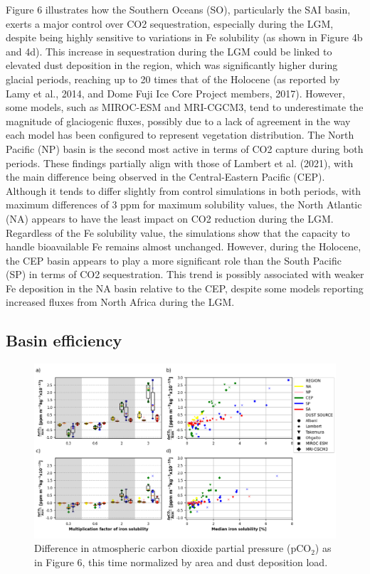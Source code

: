 Figure 6 illustrates how the Southern Oceans (SO), particularly the SAI basin, exerts a major control over CO2 sequestration, especially during the LGM, despite being highly sensitive to variations in Fe solubility (as shown in Figure 4b and 4d). This increase in sequestration during the LGM could be linked to elevated dust deposition in the region, which was significantly higher during glacial periods, reaching up to 20 times that of the Holocene (as reported by Lamy et al., 2014, and Dome Fuji Ice Core Project members, 2017). However, some models, such as MIROC-ESM and MRI-CGCM3,  tend to underestimate the magnitude of glaciogenic fluxes, possibly due to a lack of agreement in the way each model has been configured to represent vegetation distribution. The North Pacific (NP) basin is the second most active in terms of CO2 capture during both periods. These findings partially align with those of Lambert et al. (2021), with the main difference being observed in the Central-Eastern Pacific (CEP). Although it tends to differ slightly from control simulations in both periods, with maximum differences of 3 ppm for maximum solubility values, the North Atlantic (NA) appears to have the least impact on CO2 reduction during the LGM. Regardless of the Fe solubility value, the simulations show that the capacity to handle bioavailable Fe remains almost unchanged. However, during the Holocene, the CEP basin appears to play a more significant role than the South Pacific (SP) in terms of CO2 sequestration. This trend is possibly associated with weaker Fe deposition in the NA basin relative to the CEP, despite some models reporting increased fluxes from North Africa during the LGM. 

\subsection{Basin efficiency}

\begin{figure}[h!]
    \includegraphics[scale=0.65]{../../Data_function/Function/PicturePaper/Figure6_Subplot_CO2Diff_Normalize.png}
    \caption{Difference in atmospheric carbon dioxide partial pressure (pCO$_2$) as in Figure 6, this time normalized by area and dust deposition load. }
\end{figure}

